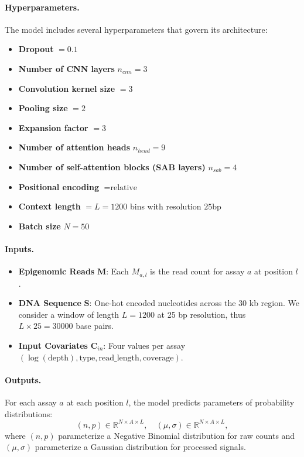 \documentclass[a4paper, 11pt]{article}
\begin{document}
\paragraph{Hyperparameters.} The model includes several hyperparameters that govern its architecture:
\begin{itemize}
    \item \textbf{Dropout} $=0.1$
    \item \textbf{Number of CNN layers} $n_{cnn}=3$
    \item \textbf{Convolution kernel size} $=3$
    \item \textbf{Pooling size} $=2$
    \item \textbf{Expansion factor} $=3$
    \item \textbf{Number of attention heads} $n_{head}=9$
    \item \textbf{Number of self-attention blocks (SAB layers)} $n_{sab}=4$
    \item \textbf{Positional encoding} $=\text{relative}$
    \item \textbf{Context length} $=L=1200$ bins with resolution $25$bp
    \item \textbf{Batch size} $N=50$
\end{itemize}

\paragraph{Inputs.}
\begin{itemize}
    \item \textbf{Epigenomic Reads} $\mathbf{M}$: Each $M_{a,l}$ is the read count for assay $a$ at position $l$.
    \item \textbf{DNA Sequence} $\mathbf{S}$: One-hot encoded nucleotides across the 30 kb region. We consider a window of length $L=1200$ at 25 bp resolution, thus $L \times 25 = 30000$ base pairs.
    \item \textbf{Input Covariates} $\mathbf{C}_{in}$: Four values per assay $(\log(\text{depth}), \text{type}, \text{read\_length}, \text{coverage})$.
\end{itemize}

\paragraph{Outputs.} For each assay $a$ at each position $l$, the model predicts parameters of probability distributions:
\[
(n,p) \in \mathbb{R}^{N \times A \times L}, \quad (\mu,\sigma) \in \mathbb{R}^{N \times A \times L},
\]
where $(n,p)$ parameterize a Negative Binomial distribution for raw counts and $(\mu,\sigma)$ parameterize a Gaussian distribution for processed signals.
\end{document}
